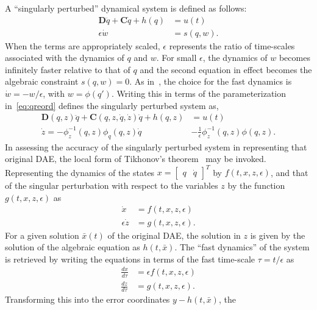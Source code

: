 \documentclass[10pt,final,journal,letterpaper,oneside,twocolumn]{IEEEtran}
\begin{document}
A ``singularly perturbed'' dynamical system is defined as follows:
\begin{align}
  \bm{D}\ddot{q} + \bm{C}\dot{q} + h(q) &= u(t)\nonumber\\
  \epsilon \dot{w} &= s(q, w).
  \label{eq:spert0}
\end{align}
When the terms are appropriately scaled, $\epsilon$ represents the
ratio of time-scales associated with the dynamics of $q$ and $w$. For
small $\epsilon$, the dynamics of $w$ becomes infinitely faster
relative to that of $q$ and the second equation in effect becomes the
algebraic constraint $s(q, w) = 0$. As in~\cite{wange_domain_2004},
the choice for the fast dynamics is $\dot{w} = -w/\epsilon $, with
$w=\phi(q')$. Writing this in terms of the
parameterization in~\cref{eq:qreord} defines the singularly perturbed
system as,
\begin{align}
  \bm{D}(q, z)\ddot{q} + \bm{C}(q, z, \dot{q}, \dot{z})\dot{q} + h(q,
  z) &= u(t)\nonumber\\
  \dot{z} = -\phi_z^{-1}(q, z)\phi_q(q, z)\dot{q} &-
            \frac{1}{\epsilon}\phi_z^{-1}(q, z)\phi(q, z).
  \label{eq:spertsys}
\end{align}
In assessing the accuracy of the singularly perturbed system in
representing that original DAE, the local form of Tikhonov's
theorem~\cite{khalil2002nonlinear} may be invoked. Representing the
dynamics of the states $x={\begin{bmatrix} q&
    \dot{q} \end{bmatrix}}^T$ by $f(t, x, z, \epsilon)$, and that of
the singular perturbation with respect to the variables $z$ by the
function $g(t, x, z, \epsilon)$ as
\begin{align}
  \dot{x} &= f(t, x, z, \epsilon)\nonumber\\
  \epsilon\dot{z} &= g(t, x, z, \epsilon).
  \label{eq:spertform}                    
\end{align}
For a given solution $\bar{x}(t)$ of the original DAE, the solution in
$z$ is given by the solution of the algebraic equation as $h(t,
\bar{x})$. The ``fast dynamics'' of the system is retrieved by writing the
equations in terms of the fast time-scale $\tau=t/\epsilon$ as 
\begin{align}
  \frac{dx}{d\tau} &= \epsilon f(t, x, z, \epsilon)\nonumber\\
  \frac{dz}{d\tau} &= g(t, x, z, \epsilon).
  \label{eq:fasttime}
\end{align}
Transforming this into the error coordinates $y-h(t, \bar{x})$, the
\end{document}

